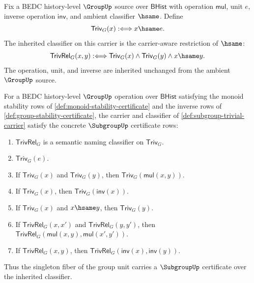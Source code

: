 \begin{definition}
\label{def:subgroup-trivial-carrier}
Fix a BEDC history-level $\GroupUp$ source over $\mathsf{BHist}$ with operation $\mathsf{mul}$, unit $e$, inverse operation $\mathsf{inv}$, and ambient classifier $\hsame$. Define
$$
\mathsf{Triv}_G(x) :\Longleftrightarrow x\hsame e.
$$
The inherited classifier on this carrier is the carrier-aware restriction of $\hsame$:
$$
\mathsf{TrivRel}_G(x,y) :\Longleftrightarrow
\mathsf{Triv}_G(x)\land\mathsf{Triv}_G(y)\land x\hsame y.
$$
The operation, unit, and inverse are inherited unchanged from the ambient $\GroupUp$ source.
\end{definition}

\begin{theorem}
\label{thm:subgroup-trivial-certificate}
For a BEDC history-level $\GroupUp$ operation over $\mathsf{BHist}$ satisfying the monoid stability rows of \autoref{def:monoid-stability-certificate} and the inverse rows of \autoref{def:group-stability-certificate}, the carrier and classifier of \autoref{def:subgroup-trivial-carrier} satisfy the concrete $\SubgroupUp$ certificate rows:
\begin{enumerate}
\item $\mathsf{TrivRel}_G$ is a semantic naming classifier on $\mathsf{Triv}_G$.
\item $\mathsf{Triv}_G(e)$.
\item If $\mathsf{Triv}_G(x)$ and $\mathsf{Triv}_G(y)$, then $\mathsf{Triv}_G(\mathsf{mul}(x,y))$.
\item If $\mathsf{Triv}_G(x)$, then $\mathsf{Triv}_G(\mathsf{inv}(x))$.
\item If $\mathsf{Triv}_G(x)$ and $x\hsame y$, then $\mathsf{Triv}_G(y)$.
\item If $\mathsf{TrivRel}_G(x,x')$ and $\mathsf{TrivRel}_G(y,y')$, then $\mathsf{TrivRel}_G(\mathsf{mul}(x,y),\mathsf{mul}(x',y'))$.
\item If $\mathsf{TrivRel}_G(x,y)$, then $\mathsf{TrivRel}_G(\mathsf{inv}(x),\mathsf{inv}(y))$.
\end{enumerate}
Thus the singleton fiber of the group unit carries a $\SubgroupUp$ certificate over the inherited classifier.
\end{theorem}
